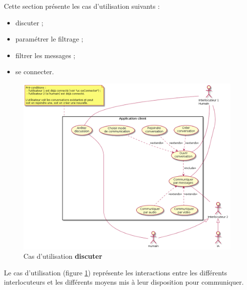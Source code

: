\documentclass[11pt,dvipsnames,svgnames]{report}
\begin{document}
Cette section présente les cas d'utilisation suivants :
\begin{itemize}
\item discuter ;
\item paramétrer le filtrage ;
\item filtrer les messages ;
\item se connecter.
\end{itemize}

\begin{figure}[H]
\includegraphics[scale=0.55]{images/uc-discuter.png}
\caption{Cas d'utilisation \textbf{discuter}}
\label{cas1}
\end{figure}
Le cas d'utilisation (figure \ref{cas1}) représente les interactions entre les différents interlocuteurs et les différents moyens mis à leur disposition pour communiquer.
\end{document}
